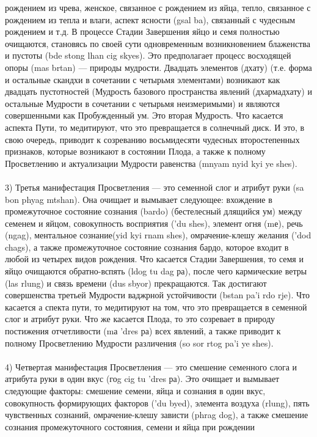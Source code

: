 рождением из чрева, женское, связанное с рождением из яйца, тепло, связанное с рождением
из тепла и влаги, аспект ясности (gsal ba), связанный с чудесным рождением и т.д. В
процессе Стадии Завершения яйцо и семя полностью очищаются, становясь по своей сути
одновременным возникновением блаженства и пустоты (bde stong lhan cig skyes). Это
предполагает процесс восходящей опоры (mas brtan) — природы мудрости. Двадцать
элементов (дхату) (т.е. форма и остальные скандхи в сочетании с четырьмя элементами)
возникают как двадцать пустотностей (Мудрость базового пространства явлений
(дхармадхату) и остальные Мудрости в сочетании с четырьмя неизмеримыми) и являются
совершенными как Пробужденный ум. Это вторая Мудрость. Что касается аспекта Пути, то
медитируют, что это превращается в солнечный диск. И это, в свою очередь, приводит к
созреванию восьмидесяти чудесных второстепенных признаков, которые возникают в
состоянии Плода, а также к полному Просветлению и актуализации Мудрости равенства
(mnyam nyid kyi ye shes).\\
\\
3) Третья манифестация Просветления — это семенной слог и атрибут руки (sa bon
phyag mtshan). Она очищает и вымывает следующее: вхождение в промежуточное состояние
сознания (bardo) (бестелесный длящийся ум) между семенем и яйцом, совокупность
восприятия ('du shes), элемент огня (mе), речь (ngag), ментальное сознание(yid kyi rnam shes),
омрачение-клешу желания ('dod chags), а также промежуточное состояние сознания бардо,
которое входит в любой из четырех видов рождения. Что касается Стадии Завершения, то
семя и яйцо очищаются обратно-вспять (ldog tu dag ра), после чего кармические ветры (las
rlung) и связь времени (dus sbyor) прекращаются. Так достигают совершенства третьей
Мудрости ваджрной устойчивости (bstan pa'i rdo rje). Что касается а спекта пути, то
медитируют на том, что это превращается в семенной слог и атрибут руки. Что же касается
Плода, то это созревает в природу постижения отчетливости (mа 'dres ра) всех явлений, а
также приводит к полному Просветлению Мудрости различения (so sor rtog  pa'i ye shes).\\
\\
4) Четвертая манифестация Просветления — это смешение семенного слога и
атрибута руки в один вкус (гоg cig tu 'dres ра). Это очищает и вымывает следующие факторы:
смешение семени, яйца и сознания в один вкус, совокупность формирующих факторов ('du
byed), элемента воздуха (rlung), пять чувственных сознаний, омрачение-клешу зависти (phrag
dog), а также смешение сознания промежуточного состояния, семени и яйца при рождении
